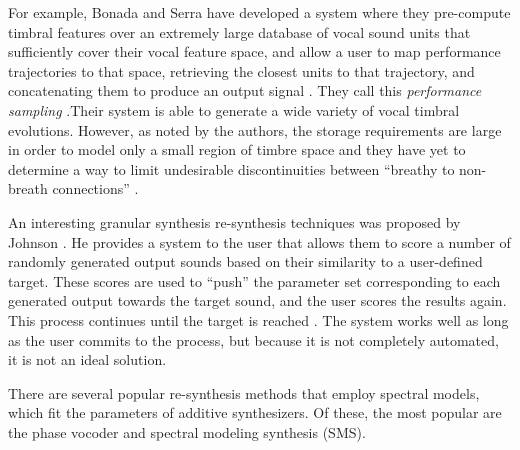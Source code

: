 \documentclass[12pt]{report} 	%
\numberwithin{figure}{chapter}
\numberwithin{table}{chapter}
\numberwithin{equation}{chapter}
\begin{document}
\begin{flushleft}
For example, Bonada and Serra have developed a system where they pre-compute timbral features over an extremely large database of vocal sound units that sufficiently cover their vocal feature space, and allow a user to map performance trajectories to that space, retrieving the closest units to that trajectory, and concatenating them to produce an output signal \cite{Bonada:2007bs}. They call this \textit{performance sampling} \cite[p. 67]{Bonada:2007bs}.Their system is able to generate a wide variety of vocal timbral evolutions. However, as noted by the authors, the storage requirements are large in order to model only a small region of timbre space and they have yet to determine a way to limit undesirable discontinuities between ``breathy to non-breath connections'' \cite[p. 78]{Bonada:2007bs}.

An interesting granular synthesis re-synthesis techniques was proposed by Johnson \cite{Johnson:1998sh}. He provides a system to the user that allows them to score a number of randomly generated output sounds based on their similarity to a user-defined target. These scores are used to ``push'' the parameter set corresponding to each generated output towards the target sound, and the user scores the results again. This process continues until the target is reached  \cite[p. 2]{Johnson:1998sh}. The system works well as long as the user commits to the process, but because it is not completely automated, it is not an ideal solution.

There are several popular re-synthesis methods that employ spectral models, which fit the parameters of additive synthesizers. Of these, the most popular are the phase vocoder and spectral modeling synthesis (SMS).


\end{flushleft}
\end{document}

